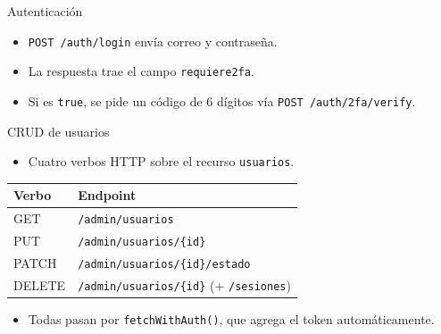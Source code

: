 \documentclass{beamer}
\begin{document}
\begin{frame}[fragile]{Autenticación}
    \begin{itemize}
        \item \texttt{POST /auth/login} envía correo y contraseña.
        \item La respuesta trae el campo \texttt{requiere2fa}.
        \item Si es \texttt{true}, se pide un código de 6 dígitos vía \texttt{POST /auth/2fa/verify}.
    \end{itemize}
    \vspace{4pt}
    
\end{frame}

\begin{frame}{CRUD de usuarios}
    \vfill
    \begin{itemize}
        \item Cuatro verbos HTTP \cite{rfc9110} sobre el recurso \texttt{usuarios}.
    \end{itemize}
    \vspace{12pt}
    \begin{center}
    \renewcommand{\arraystretch}{1.6}
    \large
    \begin{tabular}{ll}
        \hline
        \textbf{Verbo} & \textbf{Endpoint} \\
        \hline
        GET & \texttt{/admin/usuarios} \\
        PUT & \texttt{/admin/usuarios/\{id\}} \\
        PATCH & \texttt{/admin/usuarios/\{id\}/estado} \\
        DELETE & \texttt{/admin/usuarios/\{id\}} (+ \texttt{/sesiones}) \\
        \hline
    \end{tabular}
    \end{center}
    \vspace{12pt}
    \begin{itemize}
        \item Todas pasan por \texttt{fetchWithAuth()}, que agrega el token automáticamente.
    \end{itemize}
    \vfill
\end{frame}
\end{document}
